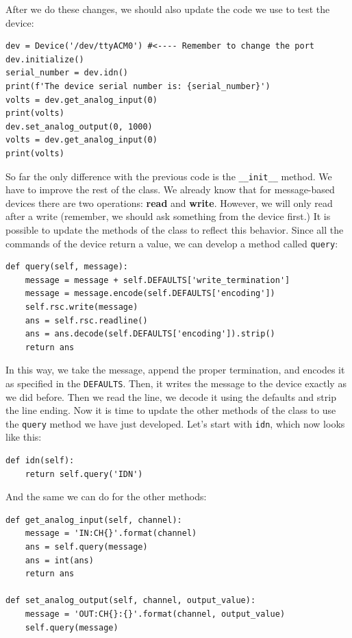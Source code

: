 After we do these changes, we should also update the code we use to test the device:

\begin{verbatim}
dev = Device('/dev/ttyACM0') #<---- Remember to change the port
dev.initialize()
serial_number = dev.idn()
print(f'The device serial number is: {serial_number}')
volts = dev.get_analog_input(0)
print(volts)
dev.set_analog_output(0, 1000)
volts = dev.get_analog_input(0)
print(volts)
\end{verbatim}

So far the only difference with the previous code is the \texttt{__init__} method. We have to improve the rest of the class. We already know that for message-based devices there are two operations: \textbf{read} and \textbf{write}. However, we will only read after a write (remember, we should ask something from the device first.) It is possible to update the methods of the class to reflect this behavior. Since all the commands of the device return a value, we can develop a method called \texttt{query}:

\begin{verbatim}
def query(self, message):
    message = message + self.DEFAULTS['write_termination']
    message = message.encode(self.DEFAULTS['encoding'])
    self.rsc.write(message)
    ans = self.rsc.readline()
    ans = ans.decode(self.DEFAULTS['encoding']).strip()
    return ans
\end{verbatim}

In this way, we take the message, append the proper termination, and encodes it as specified in the \texttt{DEFAULTS}. Then, it writes the message to the
device exactly as we did before. Then we read the line, we decode it using the defaults and strip the line ending. Now it is time to update the other methods of the class to use the \texttt{query} method we have just developed. Let's start with \texttt{idn}, which now looks like this:

\begin{verbatim}
def idn(self):
    return self.query('IDN')
\end{verbatim}

And the same we can do for the other methods:

\begin{verbatim}
def get_analog_input(self, channel):
    message = 'IN:CH{}'.format(channel)
    ans = self.query(message)
    ans = int(ans)
    return ans

def set_analog_output(self, channel, output_value):
    message = 'OUT:CH{}:{}'.format(channel, output_value)
    self.query(message)
\end{verbatim}

